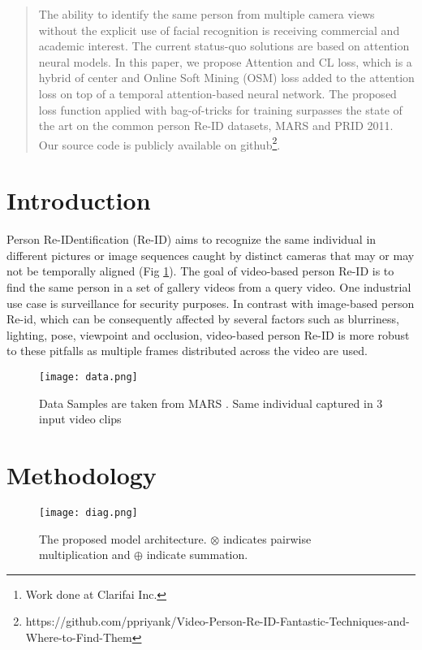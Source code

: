 \documentclass[letterpaper]{article} \usepackage{aaai20}  \usepackage{times}  \usepackage{helvet} \usepackage{courier}  \usepackage[hyphens]{url}  \usepackage{graphicx} \urlstyle{rm} \def\UrlFont{\rm}  \usepackage{graphicx}  \frenchspacing  \setlength{\pdfpagewidth}{8.5in}  \setlength{\pdfpageheight}{11in}
\author{\\  \Large \textbf{ Priyank Pathak,\textsuperscript{\rm 1}\thanks{Work done at Clarifai Inc.} Amir Erfan Eshratifar,\textsuperscript{\rm 2}\footnotemark[1]  Michael Gormish\textsuperscript{\rm 3}\footnotemark[1]} \\ 
\textsuperscript{\rm 1} Department of Computer Science, New York University,
New York, NY 10012, USA \\ 
\textsuperscript{\rm 2}University of Southern California, Los Angeles, CA 90089, USA\\
\textsuperscript{\rm 3}Clarifai, San Francisco, CA 94105, USA\\
ppriyank@nyu.edu, eshratif@usc.edu, michael.gormish@clarifai.com
}
\begin{document}
\maketitle

\begin{abstract}
The ability to identify the same person from multiple camera views without the explicit use of facial recognition is receiving commercial and academic interest. The current status-quo solutions are based on attention neural models. In this paper, we propose Attention and CL loss, which is a hybrid of center and Online Soft Mining (OSM) loss added to the attention loss on top of a temporal attention-based neural network. The proposed loss function applied with bag-of-tricks for training surpasses the state of the art on the common person Re-ID datasets, MARS and PRID 2011. Our source code is publicly available on github\footnote{https://github.com/ppriyank/Video-Person-Re-ID-Fantastic-Techniques-and-Where-to-Find-Them}. 
\end{abstract}


\section{Introduction}
\noindent  Person Re-IDentification (Re-ID) aims to recognize the same individual in different pictures or image sequences caught by distinct cameras that may or may not be temporally aligned (Fig \ref{fig:data}). The goal of video-based person Re-ID is to find the same person in a set of gallery videos from a query video. One industrial use case is surveillance for security purposes. In contrast with image-based person Re-id, which can be consequently affected by several factors such as blurriness, lighting, pose, viewpoint and occlusion, video-based person Re-ID is more robust to these pitfalls as multiple frames distributed across the video are used.

\begin{figure}[!t]
 \centering
 \texttt{[image: data.png]}
 \caption{Data Samples are taken from  MARS \cite{MARS}. 
Same individual captured in 3 input video clips
}
 \label{fig:data}
 \end{figure}

\section{Methodology}

\begin{figure*}[!ht]
 \centering
 \texttt{[image: diag.png]}
 \caption{The proposed model architecture. $\otimes$ indicates pairwise multiplication and $\oplus$ indicate summation. 
}
 \label{fig:architecture}
 \end{figure*}
 
\end{document}
